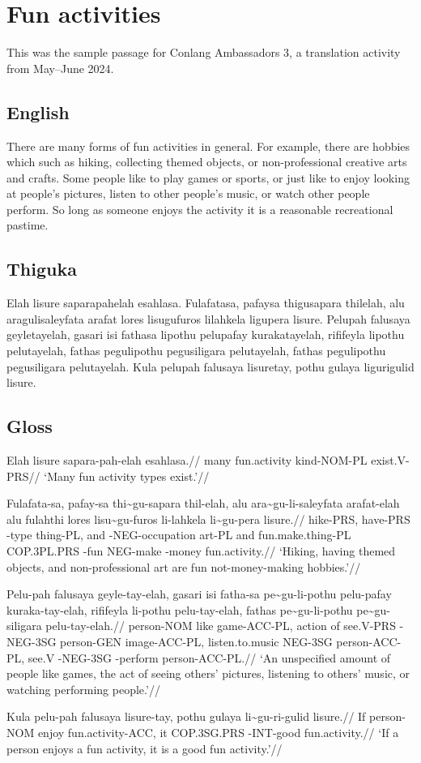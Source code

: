 
\section{Fun activities}
This was the sample passage for Conlang Ambassadors 3, a translation activity from May--June 2024.
\subsection*{English}
There are many forms of fun activities in general.
For example, there are hobbies which such as hiking, collecting themed objects, or non-professional creative arts and crafts.
Some people like to play games or sports, or just like to enjoy looking at people's pictures, listen to other people's music, or watch other people perform.
So long as someone enjoys the activity it is a reasonable recreational pastime.

\subsection*{Thiguka}
Elah lisure saparapahelah esahlasa.
Fulafatasa, pafaysa thigusapara thilelah, alu aragulisaleyfata arafat lores lisugufuros lilahkela ligupera lisure.
Pelupah falusaya geyletayelah, gasari isi fathasa lipothu pelupafay kurakatayelah, rififeyla lipothu pelutayelah, fathas pegulipothu pegusiligara pelutayelah, fathas pegulipothu pegusiligara pelutayelah.
Kula pelupah falusaya lisuretay, pothu gulaya ligurigulid lisure.

\subsection*{Gloss}
\ex
\begingl
\gla Elah lisure sapara-pah-elah esahlasa.//
\glb many fun.activity kind-NOM-PL exist.V-PRS//
\glft `Many fun activity types exist.'//
\endgl
\xe

\ex
\begingl
\gla  Fulafata-sa, pafay-sa thi\~{}gu-sapara thil-elah, alu ara\~{}gu-li-saleyfata arafat-elah alu fulahthi lores lisu\~{}gu-furos li-lahkela li\~{}gu-pera lisure.//
\glb  hike-PRS, have-PRS \agradj-type thing-PL, and \agradj-NEG-occupation art-PL and fun.make.thing-PL COP.3PL.PRS \agradj-fun NEG-make \agradj-money fun.activity.//
\glft `Hiking, having themed objects, and non-professional art are fun not-money-making hobbies.'//
\endgl
\xe

\ex
\begingl
\gla  Pelu-pah falusaya geyle-tay-elah, gasari isi fatha-sa pe\~{}gu-li-pothu pelu-pafay kuraka-tay-elah, rififeyla li-pothu pelu-tay-elah, fathas pe\~{}gu-li-pothu pe\~{}gu-siligara pelu-tay-elah.//
\glb   person-NOM like game-ACC-PL, action of see.V-PRS \agradj-NEG-3SG person-GEN image-ACC-PL, listen.to.music NEG-3SG person-ACC-PL, see.V \agradj-NEG-3SG \agradj-perform person-ACC-PL.//
\glft `An unspecified amount of people like games, the act of seeing others' pictures, listening to others' music, or watching performing people.'//
\endgl
\xe

\ex
\begingl
    \gla Kula pelu-pah   falusaya lisure-tay,       pothu gulaya      li\~{}gu-ri-gulid   lisure.//
    \glb If   person-NOM enjoy    fun.activity-ACC, it    COP.3SG.PRS \agradj-INT-good fun.activity.//
    \glft `If a person enjoys a fun activity, it is a good fun activity.'//
\endgl
\xe


